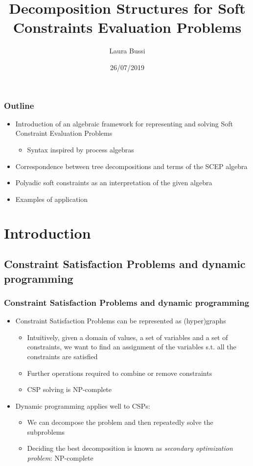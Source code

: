 \documentclass{beamer}
\title{Decomposition Structures for Soft Constraints Evaluation Problems}
\author{Laura Bussi}
\date{26/07/2019}
\institute[Università di Pisa]
\begin{document}
\frame{\titlepage}

\begin{frame}
\frametitle{Outline}
\begin{itemize}
	\item Introduction of an algebraic framework for representing and solving Soft 
	Constraint Evaluation Problems
	\begin{itemize}
		\item Syntax inspired by process algebras
	\end{itemize}
	\item Correspondence between tree decompositions and terms of the SCEP algebra
	\item Polyadic soft constraints as an interpretation of the given algebra
	\item Examples of application
\end{itemize}
\end{frame}

\section{Introduction}
 
\subsection{Constraint Satisfaction Problems and dynamic programming}
\begin{frame}
\frametitle{Constraint Satisfaction Problems and dynamic programming}
\begin{itemize}
	\item Constraint Satisfaction Problems can be represented as (hyper)graphs
	\begin{itemize}
		\item Intuitively, given a domain of values, a set of variables and a set of constraints,
		we want to find an assignment of the variables s.t. all the constraints are satisfied
		\item Further operations required to combine or remove constraints
		\item CSP solving is NP-complete
	\end{itemize}
\medskip
	\item Dynamic programming applies well to CSPs:
	\begin{itemize}
		\item We can decompose the problem and then repeatedly solve the subproblems
		\item Deciding the best decomposition is known as 
		\emph{secondary optimization problem}: NP-complete
	\end{itemize}
\end{itemize}
\end{frame}
\end{document}
